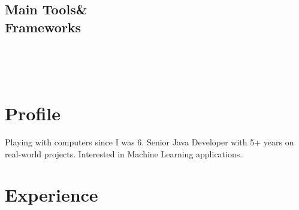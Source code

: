 \documentclass[]{friggeri-cv}
\begin{document}
\begin{aside}
  \section{Main Tools\&\\Frameworks}
    ~
\end{aside}
~
\section{Profile}
{Playing with computers since I was 6. Senior Java Developer with 5+ years on real-world projects. Interested in Machine Learning applications.}

\section{Experience}
\end{document}
